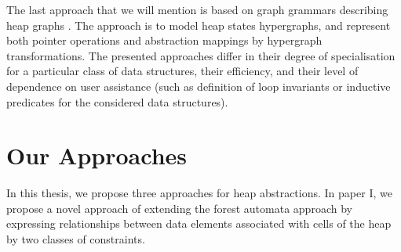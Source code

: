 The last approach that we will mention is based on graph grammars describing heap graphs \cite{Jonathan:Shape, Jonathan:Grammars}.  The approach is to model heap states hypergraphs, and represent both pointer operations and abstraction mappings by hypergraph transformations. The presented approaches differ in their degree of specialisation for a particular class of data structures, their efficiency, and their level of dependence on user assistance (such as definition of loop invariants or inductive predicates for the considered data structures).
  
\section{Our Approaches}
In this thesis, we propose three approaches for heap abstractions. In paper I, we propose a novel approach of extending the forest automata approach \cite{foresterfull} by expressing relationships between data elements associated with cells of the heap %
by two classes of constraints.


